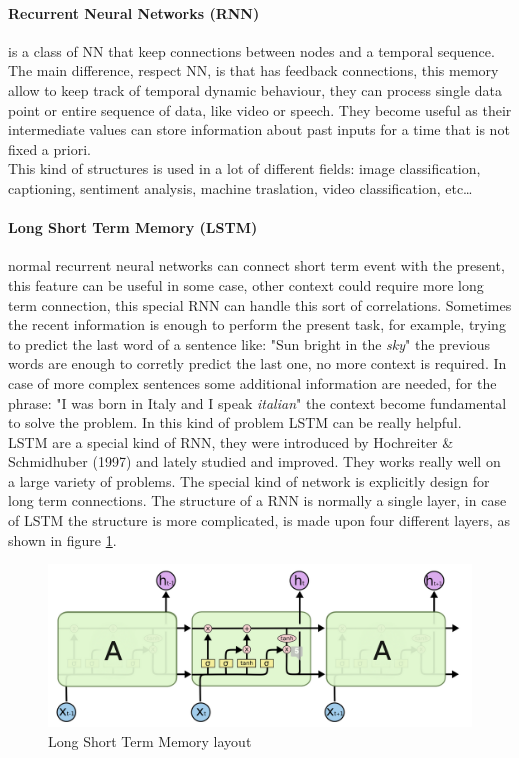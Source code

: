 \documentclass[%
    corpo=12pt,
    twoside,
    oldstyle,
    autoretitolo,
    greek,
    evenboxes,
]{toptesi}
\begin{document}
\paragraph{Recurrent Neural Networks (RNN)}  is a class of NN that keep connections between nodes and a temporal sequence. The main difference, respect NN, is that has feedback connections, this memory allow to keep track of temporal dynamic behaviour, they can process single data point or entire sequence of data, like video or speech. They become useful as their intermediate values can store information about past inputs for a time that is not fixed a priori.\\
This kind of structures is used in a lot of different fields: image classification, captioning, sentiment analysis, machine traslation, video classification, etc\dots

\paragraph{Long Short Term Memory (LSTM)} normal recurrent neural networks can connect short term event with the present, this feature can be useful in some case, other context could require more long term connection, this special RNN can handle this sort of correlations. Sometimes the recent information is enough to perform the present task, for example, trying to predict the last word of a sentence like: "Sun bright in the \textit{sky}" the previous words are enough to corretly predict the last one, no more context is required. In case of more complex sentences some additional information are needed, for the phrase: "I was born in Italy and I speak \textit{italian}" the context become fundamental to solve the problem. In this kind of problem LSTM can be really helpful.\\
LSTM are a special kind of RNN, they were introduced by Hochreiter \& Schmidhuber (1997) \cite{lstm} and lately studied and improved. They works really well on a large variety of problems. The special kind of network is explicitly design for long term connections.
The structure of a RNN is normally a single layer, in case of LSTM the structure is more complicated, is made upon four different layers, as shown in figure \ref{fig:lstm}.
\begin{figure}[!ht]
  \includegraphics[width=\linewidth]{figure/lstm.png}
  \caption{Long Short Term Memory layout}
  \label{fig:lstm}
\end{figure}
\end{document}
